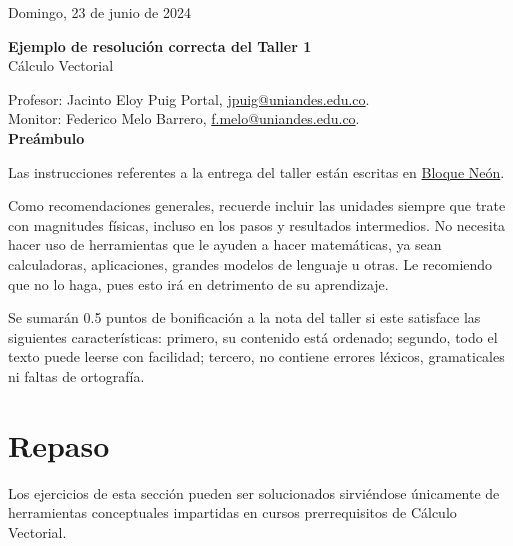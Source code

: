\documentclass{fmbvecto}
\renewcommand{\title}{Ejemplo de resolución correcta del Taller 1}
\newcommand{\subject}{Cálculo Vectorial}
\begin{document}
Domingo, 23 de junio de 2024

\begin{center}
    \textbf{\LARGE \title} \\
    {\large \subject}
\end{center}

Profesor: Jacinto Eloy Puig Portal, \href{mailto:jpuig@uniandes.edu.co}{jpuig@uniandes.edu.co}. \\
Monitor: Federico Melo Barrero, \href{mailto:f.melo@uniandes.edu.co}{f.melo@uniandes.edu.co}.\\

\textbf{\Large Preámbulo}

Las instrucciones referentes a la entrega del taller están escritas en \href{https://bloqueneon.uniandes.edu.co/d2l/home}{Bloque Neón}.

Como recomendaciones generales, recuerde incluir las unidades siempre que trate con magnitudes físicas, incluso en los pasos y resultados intermedios. No necesita hacer uso de herramientas que le ayuden a hacer matemáticas, ya sean calculadoras, aplicaciones, grandes modelos de lenguaje u otras. Le recomiendo que no lo haga, pues esto irá en detrimento de su aprendizaje.

Se sumarán 0.5 puntos de bonificación a la nota del taller si este satisface las siguientes características: primero, su contenido está ordenado; segundo, todo el texto puede leerse con facilidad; tercero, no contiene errores léxicos, gramaticales ni faltas de ortografía.

\section{Repaso}

Los ejercicios de esta sección pueden ser solucionados sirviéndose únicamente de herramientas conceptuales impartidas en cursos prerrequisitos de Cálculo Vectorial.
\end{document}
